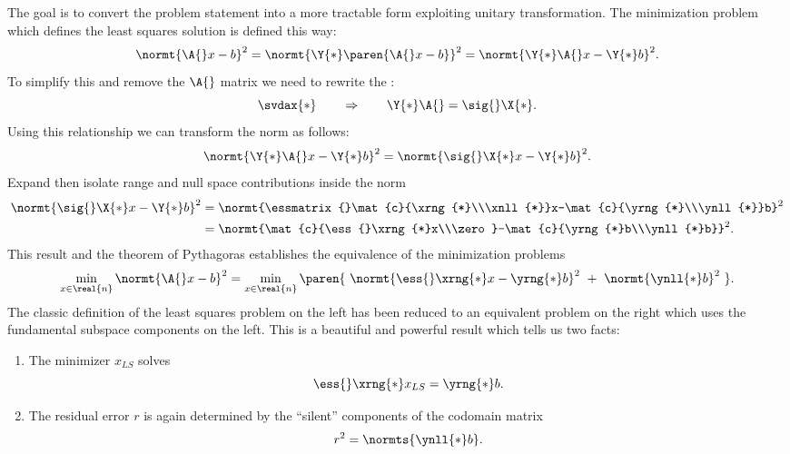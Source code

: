 The goal is to convert the problem statement into a more tractable form exploiting unitary transformation. The minimization problem which defines the least squares solution is defined this way:
\begin{equation}
  \normt{\A{}x-b}^{2} = \normt{\Y{*}\paren{ \A{}x-b }}^{2} = \normt{\Y{*}\A{}x-\Y{*}b}^{2}.
\end{equation}
To simplify this and remove the $\A{}$ matrix we need to rewrite the \svdl:
\begin{equation}
  \svdax{*} \qquad \Rightarrow \qquad \Y{*}\A{} = \sig{}\X{*}.
\end{equation}
Using this relationship we can transform the norm as follows:
\begin{equation}
  \normt{\Y{*}\A{}x-\Y{*}b}^{2} = \normt{\sig{}\X{*}x-\Y{*}b}^{2}.
\end{equation}
%
Expand then isolate range and null space contributions inside the norm
\begin{equation}
\begin{split}
  \normt{\sig{}\X{*}x-\Y{*}b}^{2} 
    &= \normt{\essmatrix{}\mat{c}{\xrng{*}\\\xnll{*}}x-\mat{c}{\yrng{*}\\\ynll{*}}b}^{2} \\
    &= \normt{\mat{c}{\ess{}\xrng{*}x\\\zero}-\mat{c}{\yrng{*}b\\\ynll{*}b}}^{2}.
\end{split}
\end{equation}
%
This result and the theorem of Pythagoras establishes the equivalence of the minimization problems
\begin{equation}
  \min\limits_{x\in\real{n}} \normt{\A{}x-b}^{2} = \min\limits_{x\in\real{n}} \paren{\ \normt{\ess{}\xrng{*}x - \yrng{*}b}^{2}\ +\ \normt{\ynll{*}b}^{2}\ }.
\end{equation}
The classic definition of the least squares problem on the left has been reduced to an equivalent problem on the right which uses the fundamental subspace components on the left. This is a beautiful and powerful result which tells us two facts:
\begin{enumerate}
\item The minimizer $x_{LS}$ solves
\begin{equation}
  \ess{}\xrng{*}x_{LS} = \yrng{*}b.
\end{equation}
\item The residual error $r$ is again determined by the ``silent'' components of the codomain matrix
\begin{equation}
  r^{2} = \normts{\ynll{*}b} .
\end{equation}
\end{enumerate}

